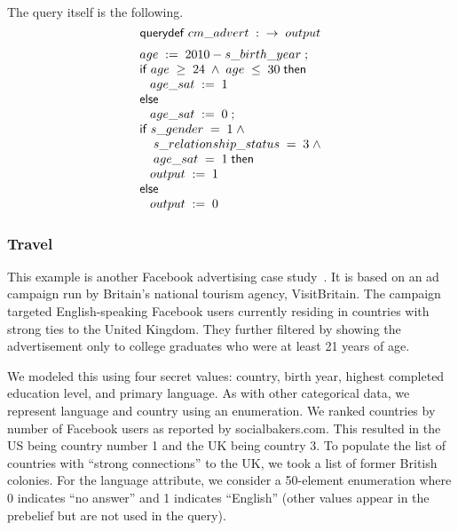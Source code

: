 The query itself is the following.
$$ \mathsf{querydef} \; cm\text{\_}advert \; : \; \; \rightarrow \; output$$
\begin{displaymath}{\small
\begin{array}{l}
  \sassign{age}{\ebinop{-}{2010}{s\text{\_}birth\text{\_}year}}\; ;\\
  \sifk \; age \; \geq \; 24 \; \wedge \; age \; \leq \; 30 \; \sthenk\\
  \;\;\;\sassign{age\text{\_}sat}{1}\\
  \selsek\\
  \;\;\;\sassign{age\text{\_}sat}{0}\; ;\\
  \sifk \; s\text{\_}gender \; = \; 1 \; \wedge \\
  \;\;\;\; s\text{\_}relationship\text{\_}status \; = \;
  3 \; \wedge \\
  \;\;\;\; age\text{\_}sat \; = \; 1 \; \sthenk\\
  \;\;\;\sassign{output}{1}\\
  \selsek\\
  \;\;\;\sassign{output}{0}\\
\end{array}
}
\end{displaymath}
\vspace{5mm} %

\subsubsection{Travel}

This example is another Facebook advertising case
study~\cite{visitbritain-case-study}.  It is based on an ad campaign
run by Britain's national tourism agency, VisitBritain.  The campaign
targeted English-speaking Facebook users currently residing in
countries with strong ties to the United Kingdom.  They further filtered by
showing the advertisement only to college graduates who were at least 21 years of age.

We modeled this using four secret values: country, birth year, highest
completed education level, and primary language.  As with other
categorical data, we represent language and country using an
enumeration.  We ranked countries by number of Facebook users as
reported by socialbakers.com.  This resulted in the US being country
number 1 and the UK being country 3.  To populate the list of
countries with ``strong connections'' to the UK, we took a list of
former British colonies.  For the language attribute, we consider a
50-element enumeration where 0 indicates ``no answer'' and 1 indicates
``English'' (other values appear in the prebelief but are not used in
the query).

